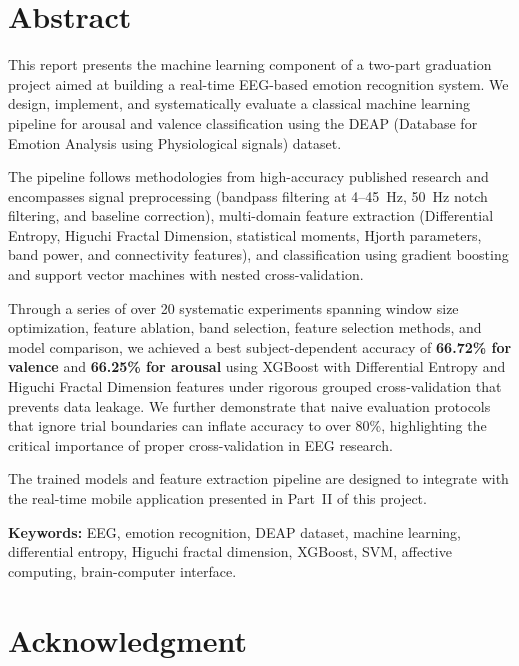 \documentclass[12pt,a4paper]{report}
\begin{document}
\newpage
\chapter*{Abstract}

This report presents the machine learning component of a two-part graduation
project aimed at building a real-time EEG-based emotion recognition system.
We design, implement, and systematically evaluate a classical machine learning
pipeline for arousal and valence classification using the DEAP
(Database for Emotion Analysis using Physiological signals) dataset.

The pipeline follows methodologies from high-accuracy published research and
encompasses signal preprocessing (bandpass filtering at 4--45~Hz, 50~Hz notch
filtering, and baseline correction), multi-domain feature extraction
(Differential Entropy, Higuchi Fractal Dimension, statistical moments, Hjorth
parameters, band power, and connectivity features), and classification using
gradient boosting and support vector machines with nested cross-validation.

Through a series of over 20 systematic experiments spanning window size
optimization, feature ablation, band selection, feature selection methods, and
model comparison, we achieved a best subject-dependent accuracy of
\textbf{66.72\% for valence} and \textbf{66.25\% for arousal} using XGBoost
with Differential Entropy and Higuchi Fractal Dimension features under rigorous
grouped cross-validation that prevents data leakage. We further demonstrate
that naive evaluation protocols that ignore trial boundaries can inflate
accuracy to over 80\%, highlighting the critical importance of proper
cross-validation in EEG research.

The trained models and feature extraction pipeline are designed to integrate
with the real-time mobile application presented in Part~II of this project.

\vspace{0.5cm}
\noindent\textbf{Keywords:} EEG, emotion recognition, DEAP dataset, machine
learning, differential entropy, Higuchi fractal dimension, XGBoost, SVM,
affective computing, brain-computer interface.

\newpage
\chapter*{Acknowledgment}
\end{document}
